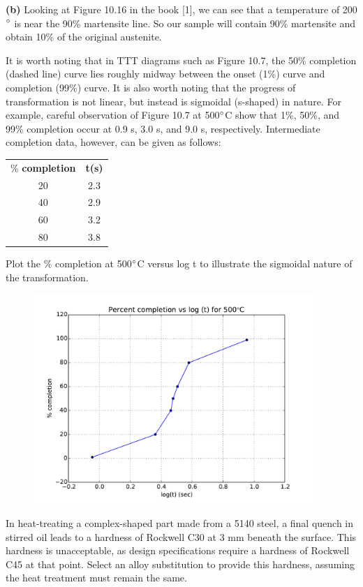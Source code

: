 \documentclass[12pt]{article}
\newenvironment{problem}[2][Problem]{\begin{trivlist}
\item[\hskip \labelsep {\bfseries #1}\hskip \labelsep {\bfseries #2.}]}{\end{trivlist}}
\begin{document}
\textbf{(b)} Looking at Figure 10.16 in the book [1], we can see that a temperature of 200$\degree$ is near the 90\% martensite line. So our sample will contain 90\% martensite and obtain 10\% of the original austenite.

\begin{problem}{10.21}
It is worth noting that in TTT diagrams such as Figure 10.7, the 50\% completion (dashed line) curve lies roughly midway between the onset (1\%) curve and completion (99\%) curve.  It is also worth noting that the progress of transformation is not linear, but instead is sigmoidal (s-shaped) in nature.  For example, careful observation of Figure 10.7 at 500$\degree$C show that 1\%, 50\%, and 99\% completion occur at 0.9 s, 3.0 s, and 9.0 s, respectively.  Intermediate completion data, however, can be given as follows: \\
\begin{center}
\begin{tabular}{c | c}
\% \textbf{completion} & \textbf{t(s)} \\
20 & 2.3 \\
40 & 2.9 \\
60 & 3.2 \\
80 & 3.8 \\
\end{tabular}
\end{center}
Plot the \% completion at 500$\degree$C versus log t to illustrate the sigmoidal nature of the transformation.
\end{problem}

\begin{figure}[H]
\centering
\includegraphics[width=300pt]{graphs/p21.pdf}
\caption{}
\end{figure}

\begin{problem}{10.31}
 In heat-treating a complex-shaped part made from a 5140 steel, a final quench in stirred oil leads to a hardness of Rockwell C30 at 3 mm beneath the surface.  This hardness is unacceptable, as design specifications require a hardness of Rockwell C45 at that point.  Select an alloy substitution to provide this hardness, assuming the heat treatment must remain the same.
 \end{problem}
 
\end{document}
